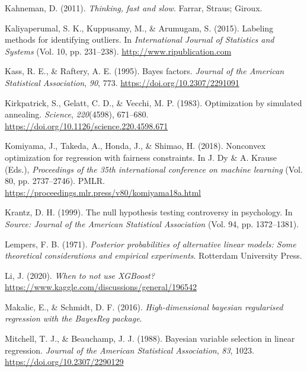 \documentclass[
  11pt,
]{article}
\newlength{\cslhangindent}
\newlength{\cslentryspacingunit} %
\newenvironment{CSLReferences}[2] %
 {%
  \setlength{\parindent}{0pt}
  \ifodd #1
  \let\oldpar\par
  \def\par{\hangindent=\cslhangindent\oldpar}
  \fi
  \setlength{\parskip}{#2\cslentryspacingunit}
 }%
 {}
\begin{document}
\begin{CSLReferences}{1}{0}
\leavevmode{}%
Kahneman, D. (2011). \emph{Thinking, fast and slow}. Farrar, Straus;
Giroux.

\leavevmode{}%
Kaliyaperumal, S. K., Kuppusamy, M., \& Arumugam, S. (2015). Labeling
methods for identifying outliers. In \emph{International Journal of
Statistics and Systems} (Vol. 10, pp. 231--238).
\url{http://www.ripublication.com}

\leavevmode{}%
Kass, R. E., \& Raftery, A. E. (1995). Bayes factors. \emph{Journal of
the American Statistical Association}, \emph{90}, 773.
\url{https://doi.org/10.2307/2291091}

\leavevmode{}%
Kirkpatrick, S., Gelatt, C. D., \& Vecchi, M. P. (1983). Optimization by
simulated annealing. \emph{Science}, \emph{220}(4598), 671--680.
\url{https://doi.org/10.1126/science.220.4598.671}

\leavevmode{}%
Komiyama, J., Takeda, A., Honda, J., \& Shimao, H. (2018). Nonconvex
optimization for regression with fairness constraints. In J. Dy \& A.
Krause (Eds.), \emph{Proceedings of the 35th international conference on
machine learning} (Vol. 80, pp. 2737--2746). PMLR.
\url{https://proceedings.mlr.press/v80/komiyama18a.html}

\leavevmode{}%
Krantz, D. H. (1999). The null hypothesis testing controversy in
psychology. In \emph{Source: Journal of the American Statistical
Association} (Vol. 94, pp. 1372--1381).

\leavevmode{}%
Lempers, F. B. (1971). \emph{Posterior probabilities of alternative
linear models: Some theoretical considerations and empirical
experiments}. Rotterdam University Press.

\leavevmode{}%
Li, J. (2020). \emph{When to not use XGBoost?}
\url{https://www.kaggle.com/discussions/general/196542}

\leavevmode{}%
Makalic, E., \& Schmidt, D. F. (2016). \emph{High-dimensional bayesian
regularised regression with the BayesReg package}.

\leavevmode{}%
Mitchell, T. J., \& Beauchamp, J. J. (1988). Bayesian variable selection
in linear regression. \emph{Journal of the American Statistical
Association}, \emph{83}, 1023. \url{https://doi.org/10.2307/2290129}


\end{CSLReferences}
\end{document}
